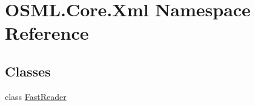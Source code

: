 \hypertarget{namespaceOSML_1_1Core_1_1Xml}{}\section{O\+S\+M\+L.\+Core.\+Xml Namespace Reference}
\label{namespaceOSML_1_1Core_1_1Xml}
\subsection*{Classes}
\begin{DoxyCompactItemize}
\item 
class \mbox{\hyperlink{classOSML_1_1Core_1_1Xml_1_1FastReader}{Fast\+Reader}}
\end{DoxyCompactItemize}
